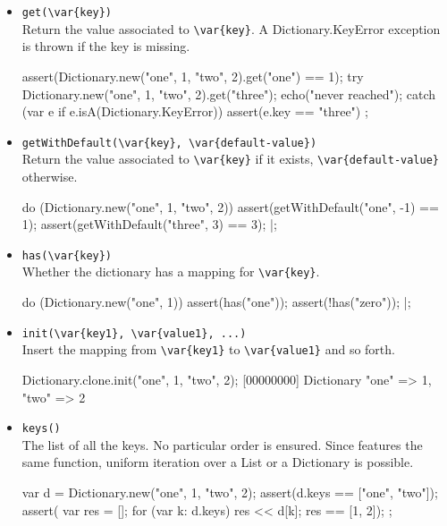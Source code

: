 \begin{itemize}
\item \lstinline|get(\var{key})|\\
  Return the value associated to \lstinline|\var{key}|.  A
  Dictionary.KeyError exception is thrown if the key is missing.

\begin{urbiscript}[firstnumber=last]
assert(Dictionary.new("one", 1, "two", 2).get("one") == 1);
try
{
  Dictionary.new("one", 1, "two", 2).get("three");
  echo("never reached");
}
catch (var e if e.isA(Dictionary.KeyError))
{
  assert(e.key == "three")
};
\end{urbiscript}


\item \lstinline|getWithDefault(\var{key}, \var{default-value})|\\
  Return the value associated to  \lstinline|\var{key}| if it exists,
  \lstinline|\var{default-value}| otherwise.

\begin{urbiscript}[firstnumber=last]
do (Dictionary.new("one", 1, "two", 2))
{
  assert(getWithDefault("one",  -1) == 1);
  assert(getWithDefault("three", 3) == 3);
}|;
\end{urbiscript}


\item \lstinline|has(\var{key})|\\
  Whether the dictionary has a mapping for \lstinline|\var{key}|.

\begin{urbiscript}[firstnumber=last]
do (Dictionary.new("one", 1))
{
  assert(has("one"));
  assert(!has("zero"));
}|;
\end{urbiscript}

\item \lstinline|init(\var{key1}, \var{value1}, ...)|~\\
  Insert the mapping from \lstinline|\var{key1}| to
  \lstinline|\var{value1}| and so forth.

\begin{urbiscript}[firstnumber=last]
Dictionary.clone.init("one", 1, "two", 2);
[00000000] Dictionary {"one" => 1, "two" => 2}
\end{urbiscript}

\item \lstinline|keys()|\\
  The list of all the keys.  No particular order is ensured.  Since
   features the same function, uniform iteration over
  a List or a Dictionary is possible.
\begin{urbiscript}[firstnumber=last]
{
  var d = Dictionary.new("one", 1, "two", 2);
  assert(d.keys == ["one", "two"]);
  assert({
           var res = [];
           for (var k: d.keys)
             res << d[k];
           res
         }
         == [1, 2]);
};
\end{urbiscript}


\end{itemize}
